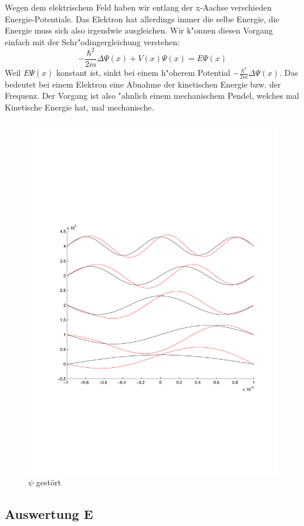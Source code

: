 \begin{refsection}
Wegen dem elektrischem Feld haben wir entlang der x-Aachse verschieden Energie-Potentiale.
Das Elektron hat allerdings immer die selbe Energie,
die Energie muss sich also irgendwie ausgleichen.
Wir k"onnen diesen Vorgang einfach mit der Schr"odingergleichung verstehen:
\[
-\frac{\hbar^2}{2m}\Delta\Psi(x) + V(x)\Psi(x)
=
E \Psi(x)
\]
Weil $E \Psi(x)$ konstant ist, sinkt bei einem h"oherem Potential $-\frac{\hbar^2}{2m}\Delta\Psi(x)$.
Das bedeutet bei einem Elektron eine Abnahme der kinetischen Energie bzw. der Frequenz.
Der Vorgang ist also "ahnlich einem mechanischem Pendel, welches mal Kinetische Energie hat, mal mechanische.

\begin{figure}
 \centering
 \includegraphics[width=12cm,clip=true,trim=2cm 7cm 1cm 8cm]{efeld/Psi_gestoert.pdf}
 \caption{$\psi$ gest\"ort}
 \label{abb:efeld_psi_gestoert}
\end{figure}



\subsection{Auswertung E}


\end{refsection}
